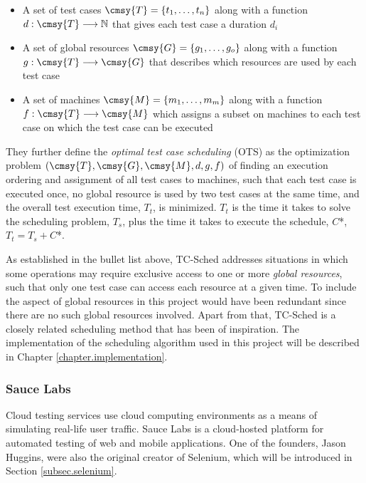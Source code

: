 \begin{itemize}
    \item A set of test cases $\cmsy{T} = \{t_{1}, \dots, t_{n}\}$ along with a function $d : \cmsy{T} \longrightarrow \mathbb{N}$ that gives each test case a duration $d_{i}$
    \item A set of global resources $\cmsy{G} = \{g_{1}, \dots, g_{o}\}$ along with a function $g : \cmsy{T} \longrightarrow \cmsy{G}$ that describes which resources are used by each test case
    \item A set of machines $\cmsy{M} = \{m_{1}, \dots, m_{m}\}$ along with a function $f : \cmsy{T} \longrightarrow \cmsy{M}$ which assigns a subset on machines to each test case on which the test case can be executed
\end{itemize}

\noindent They further define the \emph{optimal test case scheduling} (OTS) as the optimization problem $(\cmsy{T}, \cmsy{G}, \cmsy{M}, d, g, f)$ of finding an execution ordering and assignment of all test cases to machines, such that each test case is executed once, no global resource is used by two test cases at the same time, and the overall test execution time, $T_{t}$, is minimized. $T_{t}$ is the time it takes to solve the scheduling problem, $T_{s}$, plus the time it takes to execute the schedule, $C$*, $T_{t} = T_{s} + C$*.

As established in the bullet list above, TC-Sched addresses situations in which some operations may require exclusive access to one or more \emph{global resources}, such that only one test case can access each resource at a given time. To include the aspect of global resources in this project would have been redundant since there are no such global resources involved. Apart from that, TC-Sched is a closely related scheduling method that has been of inspiration. The implementation of the scheduling algorithm used in this project will be described in Chapter \ref{chapter.implementation}.


\subsubsection{Sauce Labs}
Cloud testing services use cloud computing environments as a means of simulating real-life user traffic. Sauce Labs is a cloud-hosted platform for automated testing of web and mobile applications. One of the founders, Jason Huggins, were also the original creator of Selenium, which will be introduced in Section \ref{subsec.selenium}.

